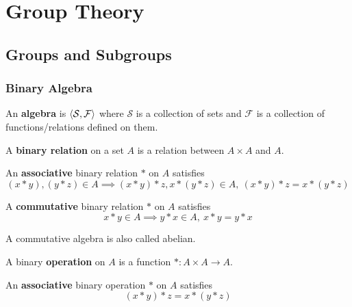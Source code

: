 \chapter{Group Theory}
\section{Groups and Subgroups}
\subsection{Binary Algebra}
\begin{definition}
	An \textbf{algebra} is $\left\langle \mathcal{S},\mathcal{F} \right\rangle$ where $\mathcal{S}$ is a collection of sets and $\mathcal{F}$ is a collection of functions/relations defined on them.
\end{definition}

\begin{definition}
	A \textbf{binary relation} on a set $A$ is a relation between $A \times A$ and $A$.
\end{definition}

\begin{definition}
	An \textbf{associative} binary relation $\ast$ on $A$ satisfies
	\begin{equation}
		(x \ast y),(y \ast z) \in A \implies (x \ast y) \ast z, x \ast (y \ast z) \in A,\ (x \ast y) \ast z = x \ast (y \ast z)
	\end{equation}
\end{definition}

\begin{definition}
	A \textbf{commutative} binary relation $\ast$ on $A$ satisfies
	\begin{equation}
		x \ast y \in A \implies y \ast x \in A,\ x \ast y = y \ast x
	\end{equation}
\end{definition}
	A commutative algebra is also called abelian.

\begin{definition}
	A binary \textbf{operation} on $A$ is a function $\ast : A \times A \to A$.
\end{definition}

\begin{definition}
	An \textbf{associative} binary operation $\ast$ on $A$ satisfies
	\begin{equation}
		(x \ast y) \ast z = x \ast (y \ast z)
	\end{equation}
\end{definition}

